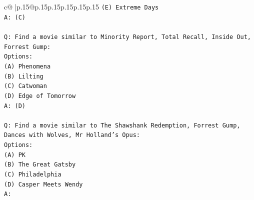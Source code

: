 \documentclass{article}
\begin{document}
{\begin{supertabular}{c@{$\;$}|p{.15\linewidth}@{}p{.15\linewidth}p{.15\linewidth}p{.15\linewidth}p{.15\linewidth}p{.15\linewidth}}
{{{\texttt{(E) Extreme Days} \\
\texttt{A: (C)} \\
\\ 
\texttt{Q: Find a movie similar to Minority Report, Total Recall, Inside Out, Forrest Gump:} \\
\texttt{Options:} \\
\texttt{(A) Phenomena} \\
\texttt{(B) Lilting} \\
\texttt{(C) Catwoman} \\
\texttt{(D) Edge of Tomorrow} \\
\texttt{A: (D)} \\
\\ 
\texttt{Q: Find a movie similar to The Shawshank Redemption, Forrest Gump, Dances with Wolves, Mr Holland's Opus:} \\
\texttt{Options:} \\
\texttt{(A) PK} \\
\texttt{(B) The Great Gatsby} \\
\texttt{(C) Philadelphia} \\
\texttt{(D) Casper Meets Wendy} \\
\texttt{A:} \\
            }
        }
    }
     \\ \\


\end{supertabular}}
\end{document}

